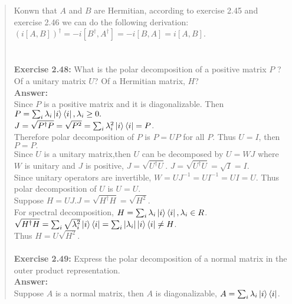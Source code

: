 \documentclass[UTF8]{ctexart}
\begin{document}
\begin{quote}
 Konwn that $A$ and $B$ are Hermitian, according to exercise 2.45 and exercise 2.46
 we can do the following derivation: \\
$(i[A, B])^{\dagger}= -i[B^{\dagger}, A^{\dagger}]=-i[B,A]=i[A,B]$.\\
\\
\\
\textbf{Exercise 2.48: } What is the polar decomposition of a positive matrix $P$ ? 
Of a unitary matrix $U$?
Of a Hermitian matrix, $H$?
 \\
\textbf{Answer:}\\
Since $P$ is a positive matrix and it is diagonalizable. Then $P=\sum_{i}\lambda_{i}\ket{i}\bra{i},\lambda_{i}\geq0. $\\
$J=\sqrt{P^{\dagger}P}=\sqrt{P^{2}} =\sum_{i}\lambda_{i}^{2}\ket{i}\bra{i}=P$.\\
Therefore polar decomposition of $P$ is $P = UP$ for all $P$. Thus $U = I$, then $P = P.$
\\
Since $U$ is a unitary matrix,then $U$ can be decomposed by $U=WJ$ where $W$ is unitary and $J$ is positive, $J=\sqrt{U^{\dagger}U}$.
$J=\sqrt{U^{\dagger}U}=\sqrt{I}=I.$\\
Since unitary operators are invertible, $W = UJ^{−1} = UI^{−1} = UI = U$. Thus polar decomposition of $U$ is $U = U$.
\\
Suppose $H = UJ.$$J=\sqrt{H^{\dagger}H}=\sqrt{H^{2}}$.\\
For spectral decomposition, $H=\sum_{i}\lambda_{i}\ket{i}\bra{i},\lambda_{i}\in R$.\\
$\sqrt{H^{\dagger}H}=\sum_{i}\sqrt{\lambda_{i}^{2}}\ket{i}\bra{i}=\sum_{i}|\lambda_{i}|\ket{i}\bra{i}\neq H$.\\
Thus $H=U\sqrt{H^{2}}$.
\\
\\
\textbf{Exercise 2.49: } Express the polar decomposition of a normal matrix in the outer product representation.
\\
\textbf{Answer:}\\

Suppose $A$ is a normal matrix, then $A$ is diagonalizable, $A=\sum_{i}\lambda_{i}\ket{i}\bra{i}$.\\


\end{quote}
\end{document}
